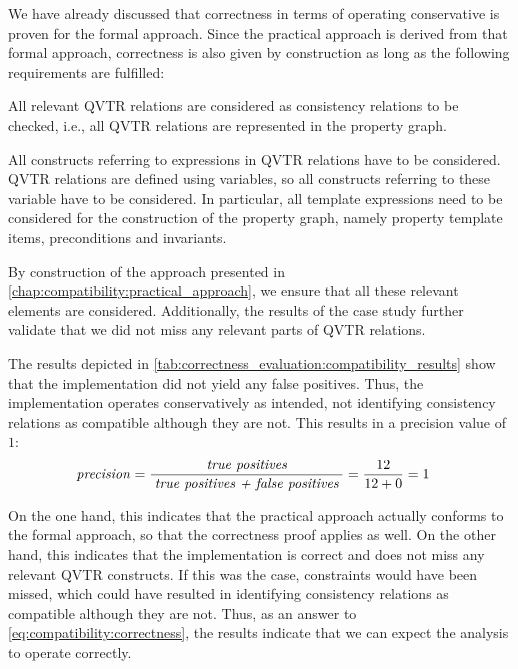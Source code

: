 We have already discussed that correctness in terms of operating conservative is proven for the formal approach.
Since the practical approach is derived from that formal approach, correctness is also given by construction as long as the following requirements are fulfilled:
\begin{longenumerate}
    \item All relevant \gls{QVTR} relations are considered as consistency relations to be checked, i.e., all \gls{QVTR} relations are represented in the property graph.
    \item All constructs referring to expressions in \gls{QVTR} relations have to be considered. \gls{QVTR} relations are defined using variables, so all constructs referring to these variable have to be considered. In particular, all template expressions need to be considered for the construction of the property graph, namely property template items, preconditions and invariants.
\end{longenumerate}
By construction of the approach presented in \autoref{chap:compatibility:practical_approach}, we ensure that all these relevant elements are considered.
Additionally, the results of the case study further validate that we did not miss any relevant parts of \gls{QVTR} relations.

The results depicted in \autoref{tab:correctness_evaluation:compatibility_results} show that the implementation did not yield any false positives.
Thus, the implementation operates conservatively as intended, not identifying consistency relations as compatible although they are not.
This results in a precision value of $1$:
\begin{align*}
    &
    \mathit{precision} = \frac{\; \textit{true positives} \;}{\; \textit{true positives + false positives} \;} = \frac{12}{12+0} = 1
\end{align*}

On the one hand, this indicates that the practical approach actually conforms to the formal approach, so that the correctness proof applies as well.
On the other hand, this indicates that the implementation is correct and does not miss any relevant \gls{QVTR} constructs.
If this was the case, constraints would have been missed, which could have resulted in identifying consistency relations as compatible although they are not.
Thus, as an answer to \autoref{eq:compatibility:correctness}, the results indicate that we can expect the analysis to operate correctly.


